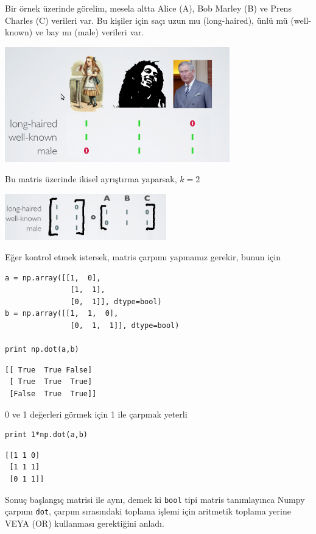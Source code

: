 \documentclass[12pt,fleqn]{article}\usepackage{../../common}
\begin{document}
Bir örnek üzerinde görelim, mesela altta Alice (A), Bob Marley (B) ve Prens
Charles (C) verileri var. Bu kişiler için saçı uzun mu (long-haired), ünlü
mü (well-known) ve bay mı (male) verileri var. 

\includegraphics[height=5cm]{abc.png}

Bu matris üzerinde ikisel ayrıştırma yaparsak, $k=2$

\includegraphics[height=2cm]{abc_res.png}

Eğer kontrol etmek istersek, matris çarpımı yapmamız gerekir, bunun için

\begin{verbatim}
a = np.array([[1,  0],
               [1,  1],
               [0,  1]], dtype=bool)
b = np.array([[1,  1,  0],
               [0,  1,  1]], dtype=bool)

print np.dot(a,b)
\end{verbatim}

\begin{verbatim}
[[ True  True False]
 [ True  True  True]
 [False  True  True]]
\end{verbatim}

0 ve 1 değerleri görmek için 1 ile çarpmak yeterli

\begin{verbatim}
print 1*np.dot(a,b)
\end{verbatim}

\begin{verbatim}
[[1 1 0]
 [1 1 1]
 [0 1 1]]
\end{verbatim}

Sonuç başlangıç matrisi ile aynı, demek ki \verb!bool! tipi matris
tanımlayınca Numpy çarpımı \verb!dot!, çarpım sırasındaki toplama işlemi
için aritmetik toplama yerine VEYA (OR) kullanması gerektiğini anladı.
\end{document}
